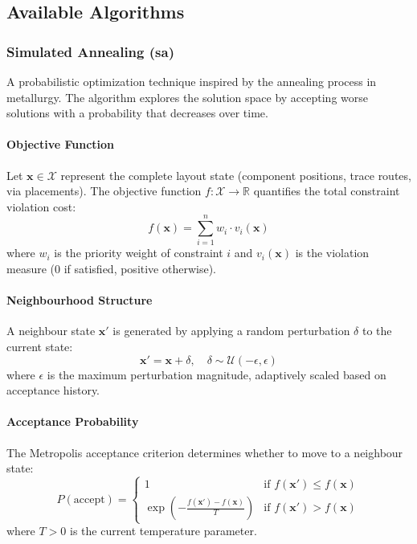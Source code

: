 \documentclass{report}
\begin{document}
\subsection{Available Algorithms}

\subsubsection{Simulated Annealing (sa)}
A probabilistic optimization technique inspired by the annealing process in metallurgy. The algorithm explores the solution space by accepting worse solutions with a probability that decreases over time.

\paragraph{Objective Function}
Let $\mathbf{x} \in \mathcal{X}$ represent the complete layout state (component positions, trace routes, via placements). The objective function $f: \mathcal{X} \rightarrow \mathbb{R}$ quantifies the total constraint violation cost:
\begin{equation}
f(\mathbf{x}) = \sum_{i=1}^{n} w_i \cdot v_i(\mathbf{x})
\end{equation}
where $w_i$ is the priority weight of constraint $i$ and $v_i(\mathbf{x})$ is the violation measure (0 if satisfied, positive otherwise).

\paragraph{Neighbourhood Structure}
A neighbour state $\mathbf{x}'$ is generated by applying a random perturbation $\delta$ to the current state:
\begin{equation}
\mathbf{x}' = \mathbf{x} + \delta, \quad \delta \sim \mathcal{U}(-\epsilon, \epsilon)
\end{equation}
where $\epsilon$ is the maximum perturbation magnitude, adaptively scaled based on acceptance history.

\paragraph{Acceptance Probability}
The Metropolis acceptance criterion determines whether to move to a neighbour state:
\begin{equation}
P(\text{accept}) = \begin{cases}
1 & \text{if } f(\mathbf{x}') \leq f(\mathbf{x}) \\
\exp\left(-\frac{f(\mathbf{x}') - f(\mathbf{x})}{T}\right) & \text{if } f(\mathbf{x}') > f(\mathbf{x})
\end{cases}
\end{equation}
where $T > 0$ is the current temperature parameter.
\end{document}
